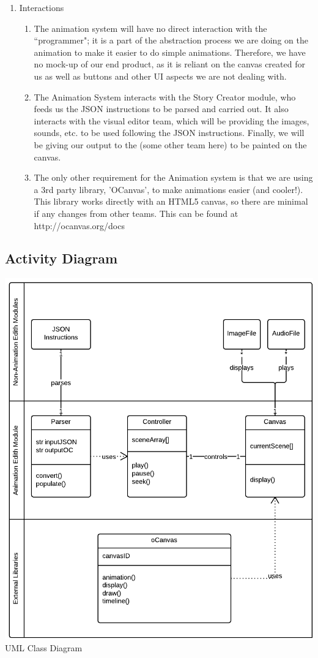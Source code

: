 \documentclass[12pt]{article}
\begin{document}
\begin{enumerate}
\item Interactions
\begin{enumerate}
\item The animation system will have no direct interaction with the ``programmer"; it is a part of the abstraction process we are doing on the animation to make it easier to do simple animations. Therefore, we have no mock-up of our end product, as it is reliant on the canvas created for us as well as buttons and other UI aspects we are not dealing with.
\item The Animation System interacts with the Story Creator module, who feeds us the JSON instructions to be parsed and carried out. It also interacts with the visual editor team, which will be providing the images, sounds, etc. to be used following the JSON instructions. Finally, we will be giving our output to the (some other team here) to be painted on the canvas.
\item The only other requirement for the Animation system is that we are using a 3rd party library, 'OCanvas', to make animations easier (and cooler!). This library works directly with an HTML5 canvas, so there are minimal if any changes from other teams. This can be found at http://ocanvas.org/docs

\end{enumerate}



\end{enumerate}

\subsection{Activity Diagram}
\includegraphics[scale=.45]{AnimationUMLClassDiagram.png}
\\UML Class Diagram
\pagebreak
\end{document}
